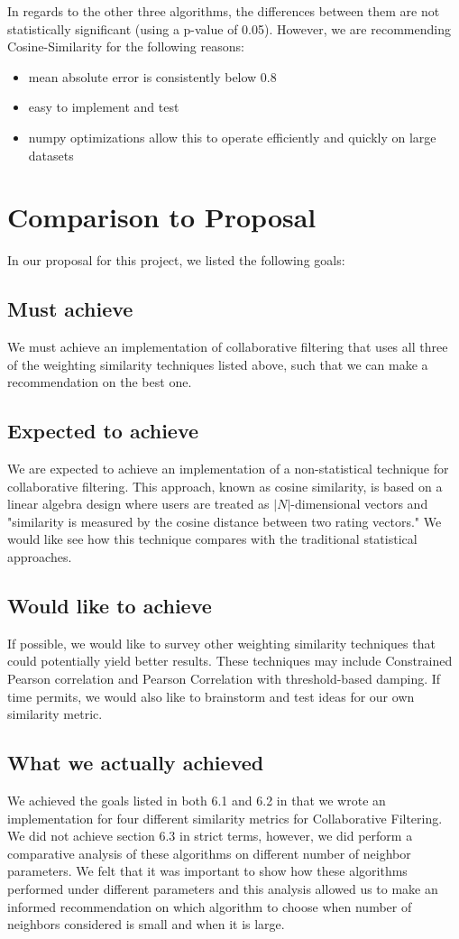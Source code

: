 \documentclass[11pt,letterpaper]{article}
\begin{document}
In regards to the other three algorithms, the differences between them are not statistically significant (using a p-value of 0.05). However, we are recommending Cosine-Similarity for the following reasons:
\begin{itemize}
\setlength\itemsep{0em}
    \item mean absolute error is consistently below 0.8
    \item easy to implement and test
    \item numpy optimizations allow this to operate efficiently and quickly on large datasets
\end{itemize}


\section{Comparison to Proposal}
In our proposal for this project, we listed the following goals:
\subsection{Must achieve}
We must achieve an implementation of collaborative filtering that uses all three of the weighting similarity techniques listed above, such that we can make a recommendation on the best one.
\subsection{Expected to achieve}
We are expected to achieve an implementation of a non-statistical technique for collaborative filtering. This approach, known as cosine similarity, is based on a linear algebra design where users are treated as $|N|$-dimensional vectors and "similarity is measured
by the cosine distance between two rating vectors." We would like see how this technique compares with the traditional statistical approaches.
\subsection{Would like to achieve}
If possible, we would like to survey other weighting similarity techniques that could potentially yield better results. These techniques may include Constrained Pearson correlation and Pearson Correlation with threshold-based damping. If time permits, we would also like to brainstorm and test ideas for our own similarity metric.
\subsection{What we actually achieved}
We achieved the goals listed in both 6.1 and 6.2 in that we wrote an implementation for four different similarity metrics for Collaborative Filtering. We did not achieve section 6.3 in strict terms, however, we did perform a comparative analysis of these algorithms on different number of neighbor parameters. We felt that it was important to show how these algorithms performed under different parameters and this analysis allowed us to make an informed recommendation on which algorithm to choose when number of neighbors considered is small and when it is large.
\end{document}
